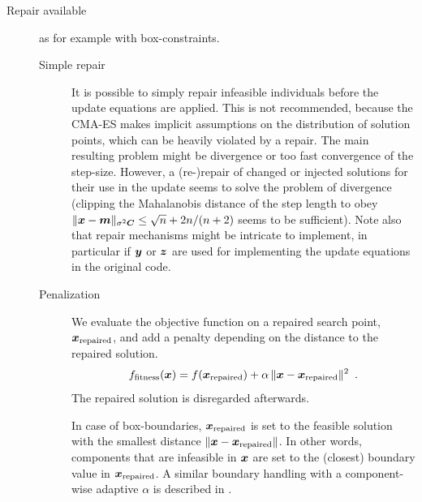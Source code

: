 \documentclass{article} %
\newcommand{\ve}[1]{\mathchoice{\mbox{\boldmath$\displaystyle#1$}}
  {\mbox{\boldmath$\textstyle#1$}} {\mbox{\boldmath$\scriptstyle#1$}}
  {\mbox{\boldmath$\scriptscriptstyle#1$}}}
\newcommand{\N}{\ensuremath{n}}
\newcommand{\sig}{\ensuremath{\sigma}}
\newcommand{\x}{\ve{x}}
\newcommand{\y}{\ve{y}}
\newcommand{\z}{\ve{z}}
\newcommand{\xmean}{\ensuremath{\ve{m}}}
\begin{document}
\begin{appendix}
\begin{description}
 \item[Repair available] as for example with box-constraints. 

\begin{description} 

  \item[Simple repair]  
 It is possible to simply repair infeasible individuals before the update equations are applied. This is not recommended, because the CMA-ES makes implicit assumptions on the distribution of solution points, which can be heavily violated by a repair. The main resulting problem might be divergence or too fast convergence of the step-size. However, a (re-)repair of changed or injected solutions for their use in the update seems to solve the problem of divergence \cite{Hansen:2011} (clipping the Mahalanobis distance of the step length to obey $\|\x-\xmean\|_{\sig^2\C}\le\sqrt\N + 2 \N / (\N + 2)$ seems to be sufficient). Note also that repair mechanisms might be intricate to implement, in particular if $\y$ or $\z$ are used for implementing the update equations in the original code. 

  \item[Penalization] We evaluate the objective function on a repaired
  search point, $\ve{x}_{\mathrm{repaired}}$, and add a penalty
  depending on the distance to the repaired solution.
%
\begin{equation} \label{eq:penbound}
  f_\mathrm{fitness}(\ve{x}) = f(\ve{x}_{\mathrm{repaired}}) +
  \alpha\, \|\ve{x}-\ve{x}_{\mathrm{repaired}}\|^2 \enspace.
\end{equation}
%
  The repaired solution is disregarded afterwards. 

  In case of box-boundaries, $\ve{x}_{\mathrm{repaired}}$ is set to
  the feasible solution with the smallest distance
  $\|\ve{x}-\ve{x}_{\mathrm{repaired}}\|$. In other words, components
  that are infeasible in $\ve{x}$ are set to the (closest) boundary
  value in $\ve{x}_{\mathrm{repaired}}$.  A similar boundary handling
  with a component-wise adaptive $\alpha$ is described in
  \cite{hansen:08}.
  
 \end{description}


\end{description}
\end{appendix}
\end{document}
